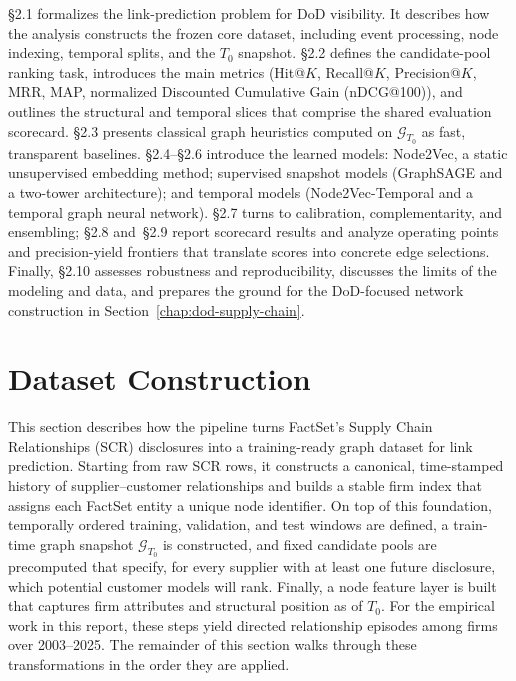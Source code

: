 \S2.1 formalizes the link-prediction problem for DoD visibility. It describes how the analysis constructs the frozen core dataset, including event processing, node indexing, temporal splits, and the $T_0$ snapshot. \S2.2 defines the candidate-pool ranking task, introduces the main metrics (Hit@$K$, Recall@$K$, Precision@$K$, MRR, MAP, normalized Discounted Cumulative Gain (nDCG@100)), and outlines the structural and temporal slices that comprise the shared evaluation scorecard. \S2.3 presents classical graph heuristics computed on $\mathcal{G}_{T_0}$ as fast, transparent baselines. \S2.4--\S2.6 introduce the learned models: Node2Vec, a static unsupervised embedding method; supervised snapshot models (GraphSAGE and a two-tower architecture); and temporal models (Node2Vec-Temporal and a temporal graph neural network). \S2.7 turns to calibration, complementarity, and ensembling; \S2.8 and~\S2.9 report scorecard results and analyze operating points and precision-yield frontiers that translate scores into concrete edge selections. Finally, \S2.10 assesses robustness and reproducibility, discusses the limits of the modeling and data, and prepares the ground for the DoD-focused network construction in Section~\ref{chap:dod-supply-chain}.

\section{Dataset Construction}

This section describes how the pipeline turns FactSet's Supply Chain Relationships (SCR) disclosures into a training-ready graph dataset for link prediction. Starting from raw SCR rows, it constructs a canonical, time-stamped history of supplier--customer relationships and builds a stable firm index that assigns each FactSet entity a unique node identifier. On top of this foundation, temporally ordered training, validation, and test windows are defined, a train-time graph snapshot \(\mathcal{G}_{T_0}\) is constructed, and fixed candidate pools are precomputed that specify, for every supplier with at least one future disclosure, which potential customer models will rank. Finally, a node feature layer is built that captures firm attributes and structural position as of \(T_0\). For the empirical work in this report, these steps yield \NumEpisodes directed relationship episodes among \NumFirms firms over 2003--2025. The remainder of this section walks through these transformations in the order they are applied.

